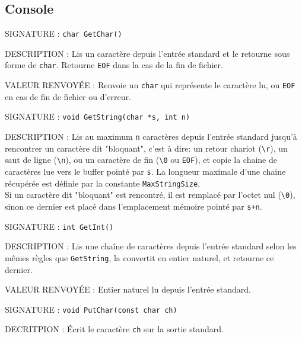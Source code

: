 \documentclass{article}
\begin{document}
	\subsection{Console}
	\begin{description}
		\item{SIGNATURE : } \texttt{char GetChar()}
		\item{DESCRIPTION :}{ Lis un caractère depuis l'entrée standard et le retourne sous forme de \texttt{char}. Retourne \texttt{EOF} dans la cas de la fin de fichier.}
		\item{VALEUR RENVOYÉE : } Renvoie un \texttt{char} qui représente le caractère lu, ou \texttt{EOF} en cas de fin de fichier ou d'erreur.
	\end{description}
	\vspace{2.5mm}
	\begin{description}
		\item{SIGNATURE : } \texttt{void GetString(char *s, int n)}
		\item{DESCRIPTION : } Lis au maximum \texttt{n} caractères depuis l'entrée standard jusqu'à rencontrer un caractère dit "bloquant", c'est à dire: un retour chariot (\texttt{\textbackslash{}r}), un saut de ligne (\texttt{\textbackslash{}n}), ou un caractère de fin (\texttt{\textbackslash{}0} ou \texttt{EOF}), et copie la chaine de caractères lue vers le buffer pointé par \texttt{s}. La longueur maximale d'une chaine récupérée est définie par la constante \texttt{MaxStringSize}. \\Si un caractère dit "bloquant" est rencontré, il est remplacé par l'octet nul (\texttt{\textbackslash{}0}), sinon ce dernier est placé dans l'emplacement mémoire pointé par \texttt{s+n}.
	\end{description}
	\vspace{2.5mm}
	\begin{description}
	\item{SIGNATURE : } \texttt{int GetInt()}
	\item{DESCRIPTION : } Lis une chaîne de caractères depuis l'entrée standard selon les mêmes règles que \texttt{GetString}, la convertit en entier naturel, et retourne ce dernier.
	\item{VALEUR RENVOYÉE : } Entier naturel lu depuis l'entrée standard.
	\end{description}
	\vspace{2.5mm}
	\begin{description}
		\item{SIGNATURE : } \texttt{void PutChar(const char ch)}
		\item{DECRITPION : } Écrit le caractère \texttt{ch} sur la sortie standard. 
	\end{description}
\end{document}
